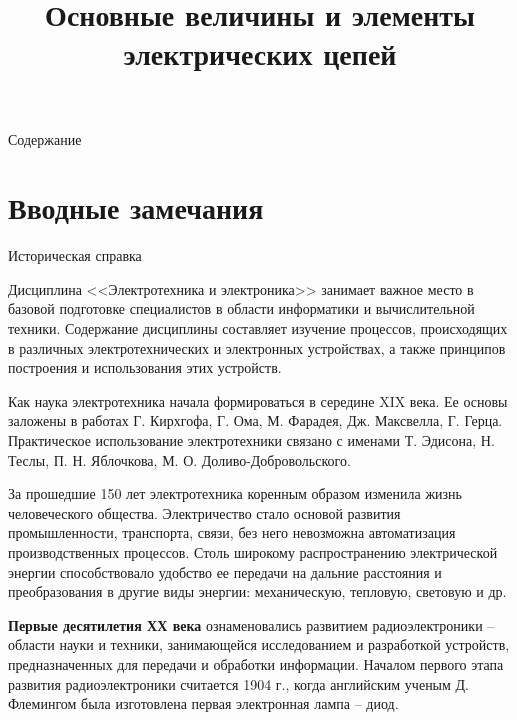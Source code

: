 \documentclass[12pt, pdf, hyperref={unicode},handout]{beamer}
\title[Лекция 1]{\Huge{Основные величины и элементы электрических цепей}}
\author[\textcopyright   Артамонов Ю.Н.]{}
\institute[]{}
\date{}
\begin{document}
\begin{frame}
  \titlepage
\end{frame}

\begin{frame}{Содержание}
  \tableofcontents
\end{frame}

\section{Вводные замечания}


\begin{frame}{Историческая справка}
  \begin{block}

    \small{
   Дисциплина <<Электротехника и электроника>> занимает важное место в базовой подготовке специалистов в области информатики и вычислительной техники. Содержание дисциплины составляет изучение процессов, происходящих в различных электротехнических и электронных устройствах, а также принципов построения и использования этих устройств.

Как наука электротехника начала формироваться в середине XIX века. Ее основы заложены в работах Г. Кирхгофа, Г. Ома, М. Фарадея, Дж. Максвелла, Г. Герца. Практическое использование электротехники связано с именами Т. Эдисона, Н. Теслы, П. Н. Яблочкова, М. О. Доливо-Добровольского.

За прошедшие 150 лет электротехника коренным образом изменила жизнь человеческого общества. Электричество стало основой развития промышленности, транспорта, связи, без него невозможна автоматизация производственных процессов. Столь широкому распространению электрической энергии способствовало удобство ее передачи на дальние расстояния и преобразования в другие виды энергии: механическую, тепловую, световую и др.

\textbf{Первые десятилетия ХХ века} ознаменовались развитием радиоэлектроники – области науки и техники, занимающейся исследованием и разработкой устройств, предназначенных для передачи и обработки информации. Началом первого этапа развития радиоэлектроники считается 1904 г., когда английским ученым Д. Флемингом была изготовлена первая электронная лампа – диод. 
}

  \end{block}
  
\end{frame}
\end{document}
